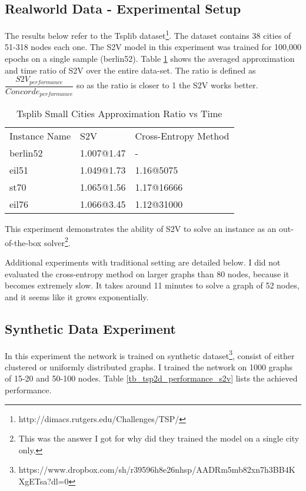 \documentclass[10pt,a4paper,draft]{article}
\begin{document}
\subsection{Realworld Data - Experimental Setup}
	The results below refer to the Tsplib dataset\footnote{http://dimacs.rutgers.edu/Challenges/TSP/}. The dataset contains 38 cities of 51-318 nodes each one.
	The S2V model in this experiment was trained for 100,000 epochs on a single sample (berlin52). 
	Table \ref{tb_tsplib_performance_s2v_vs_ce} shows the averaged approximation and time ratio of S2V over the entire data-set. The ratio is defined as $\dfrac{S2V_{performance}}{Concorde_{performance}} $ so as the ratio is closer to 1 the S2V works better.
	
	\begin{table}[h] \centering
	\begin{tabular}{lll}
	 	Instance Name	& S2V   		& Cross-Entropy Method 	\\
	 	berlin52 		& 1.007@1.47	& - 					\\
		eil51  			& 1.049@1.73	& 1.16@5075				\\
		st70 			& 1.065@1.56 	& 1.17@16666 			\\
		eil76			& 1.066@3.45 	& 1.12@31000
	\end{tabular}
	\caption{Tsplib Small Cities Approximation Ratio vs Time} 
	\label{tb_tsplib_performance_s2v_vs_ce}
	\end{table}
	This experiment demonstrates the ability of S2V to solve an instance as an out-of-the-box solver\footnote{This was the answer I got for why did they trained the model on a single city only.}. 
	
	Additional experiments with traditional setting are detailed below. I did not evaluated the cross-entropy method on larger graphs than 80 nodes, because it becomes extremely slow. It takes around 11 minutes to solve a graph of 52 nodes, and it seems like it grows exponentially.
	

\subsection{Synthetic Data Experiment}
In this experiment the network is trained on synthetic dataset\footnote{https://www.dropbox.com/sh/r39596h8e26nhsp/AADRm5mb82xn7h3BB4KXgETsa?dl=0}, consist of either clustered or uniformly distributed graphs.
I trained the network on 1000 graphs of 15-20 and 50-100 nodes. Table \ref{tb_tsp2d_performance_s2v} lists the achieved performance. 
\end{document}
